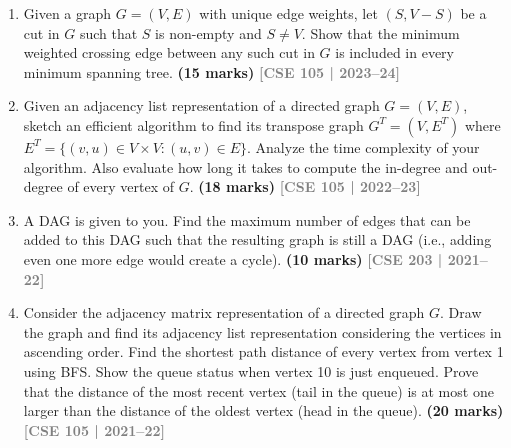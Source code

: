 \documentclass[12pt,a3paper]{article}
\newcommand{\yr}[1]{\hfill\textcolor{gray}{\small\textbf{[#1]}}}
\newcommand{\mk}[1]{\textcolor{orange!70!black}{\small\textbf{(#1 marks)}}}
\begin{document}
\begin{enumerate}
\item Given a graph $G = (V, E)$ with unique edge weights, let $(S, V-S)$ be a cut in $G$ such that $S$ is non-empty and $S \neq V$. Show that the minimum weighted crossing edge between any such cut in $G$ is included in every minimum spanning tree. \mk{15}
\yr{CSE 105 | 2023--24}

\item Given an adjacency list representation of a directed graph $G = (V, E)$, sketch an efficient algorithm to find its transpose graph $G^T = (V, E^T)$ where $E^T = \{(v, u) \in V \times V : (u, v) \in E\}$. Analyze the time complexity of your algorithm. Also evaluate how long it takes to compute the in-degree and out-degree of every vertex of $G$. \mk{18}
\yr{CSE 105 | 2022--23}

\item A DAG is given to you. Find the maximum number of edges that can be added to this DAG such that the resulting graph is still a DAG (i.e., adding even one more edge would create a cycle). \mk{10}
\yr{CSE 203 | 2021--22}

\item Consider the adjacency matrix representation of a directed graph $G$. Draw the graph and find its adjacency list representation considering the vertices in ascending order. Find the shortest path distance of every vertex from vertex 1 using BFS. Show the queue status when vertex 10 is just enqueued. Prove that the distance of the most recent vertex (tail in the queue) is at most one larger than the distance of the oldest vertex (head in the queue). \mk{20}
\yr{CSE 105 | 2021--22}


\end{enumerate}
\end{document}
